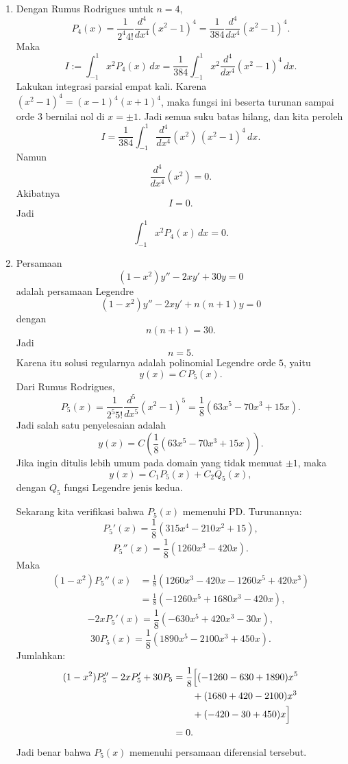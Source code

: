 \documentclass[11pt,letterpaper]{article}
\begin{document}
\begin{enumerate}[leftmargin=*, itemsep=0.45cm]
  \item Dengan Rumus Rodrigues untuk $n=4$,
        \[
          P_4(x)=\frac{1}{2^4 4!}\frac{d^4}{dx^4}(x^2-1)^4
          =\frac{1}{384}\frac{d^4}{dx^4}(x^2-1)^4.
        \]
        Maka
        \[
          I:=\int_{-1}^{1}x^2P_4(x)\,dx
          =
          \frac{1}{384}\int_{-1}^{1}x^2\frac{d^4}{dx^4}(x^2-1)^4\,dx.
        \]
        Lakukan integrasi parsial empat kali. Karena $(x^2-1)^4=(x-1)^4(x+1)^4$,
        maka fungsi ini beserta turunan sampai orde $3$ bernilai nol di $x=\pm 1$.
        Jadi semua suku batas hilang, dan kita peroleh
        \[
          I
          =
          \frac{1}{384}\int_{-1}^{1}\frac{d^4}{dx^4}(x^2)\,(x^2-1)^4\,dx.
        \]
        Namun
        \[
          \frac{d^4}{dx^4}(x^2)=0.
        \]
        Akibatnya
        \[
          I=0.
        \]
        Jadi
        \[
          \boxed{\int_{-1}^{1}x^2P_4(x)\,dx=0.}
        \]

  \item Persamaan
        \[
          (1-x^2)y''-2xy'+30y=0
        \]
        adalah persamaan Legendre
        \[
          (1-x^2)y''-2xy'+n(n+1)y=0
        \]
        dengan
        \[
          n(n+1)=30.
        \]
        Jadi
        \[
          n=5.
        \]
        Karena itu solusi regularnya adalah polinomial Legendre orde $5$, yaitu
        \[
          y(x)=C\,P_5(x).
        \]
        Dari Rumus Rodrigues,
        \[
          P_5(x)=\frac{1}{2^5 5!}\frac{d^5}{dx^5}(x^2-1)^5
          =\frac{1}{8}(63x^5-70x^3+15x).
        \]
        Jadi salah satu penyelesaian adalah
        \[
          y(x)=C\left(\frac{1}{8}(63x^5-70x^3+15x)\right).
        \]
        Jika ingin ditulis lebih umum pada domain yang tidak memuat $\pm 1$, maka
        \[
          y(x)=C_1P_5(x)+C_2Q_5(x),
        \]
        dengan $Q_5$ fungsi Legendre jenis kedua.

        Sekarang kita verifikasi bahwa $P_5(x)$ memenuhi PD. Turunannya:
        \[
          P_5'(x)=\frac{1}{8}(315x^4-210x^2+15),
        \]
        \[
          P_5''(x)=\frac{1}{8}(1260x^3-420x).
        \]
        Maka
        \begin{align*}
          (1-x^2)P_5''(x)
           & =\frac{1}{8}(1260x^3-420x-1260x^5+420x^3) \\
           & =\frac{1}{8}(-1260x^5+1680x^3-420x),
        \end{align*}
        \[
          -2xP_5'(x)=\frac{1}{8}(-630x^5+420x^3-30x),
        \]
        \[
          30P_5(x)=\frac{1}{8}(1890x^5-2100x^3+450x).
        \]
        Jumlahkan:
        \begin{align*}
          (1-x^2)P_5''-2xP_5'+30P_5
           & =\frac{1}{8}\Bigl[
          (-1260-630+1890)x^5           \\
           & \qquad +(1680+420-2100)x^3 \\
           & \qquad +(-420-30+450)x
          \Bigr]                        \\
           & =0.
        \end{align*}
        Jadi benar bahwa $P_5(x)$ memenuhi persamaan diferensial tersebut.


\end{enumerate}
\end{document}
